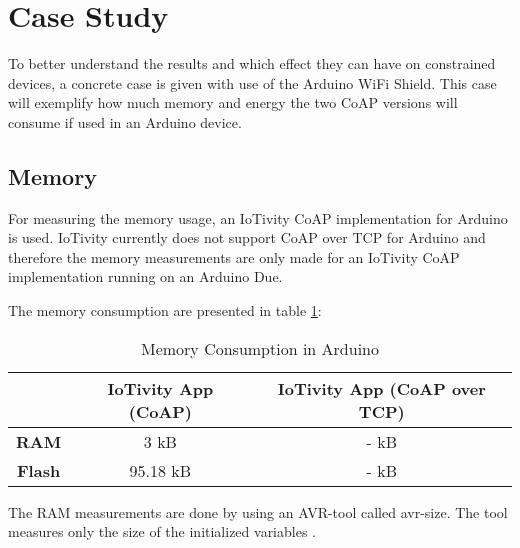 \section{Case Study} \label{sec:casestudy}
To better understand the results and which effect they can have on constrained devices, a concrete case is given with use of the Arduino WiFi Shield. This case will exemplify how much memory and energy the two CoAP versions will consume if used in an Arduino device.

\subsection{Memory}
For measuring the memory usage, an IoTivity CoAP implementation for Arduino is used. IoTivity currently does not support CoAP over TCP for Arduino and therefore the memory measurements are only made for an IoTivity CoAP implementation running on an Arduino Due.
 
The memory consumption are presented in table \ref{tab:memory}:
\begin{table}[bht]
	\renewcommand{\arraystretch}{1.3}
	\caption{Memory Consumption in Arduino}
	\label{tab:memory}
	\centering
	\begin{tabular}{|c|c|c|}
		\hline
		\bfseries  & \bfseries IoTivity App (CoAP) & \bfseries IoTivity App (CoAP over TCP) \\
		\hline
		\textbf{RAM} & 3 kB & - kB \\
		\hline
		\textbf{Flash} & 95.18 kB & - kB \\
		\hline
	\end{tabular}
\end{table}

The RAM measurements are done by using an AVR-tool called avr-size. The tool measures only the size of the initialized variables \cite{Check55:online}.

